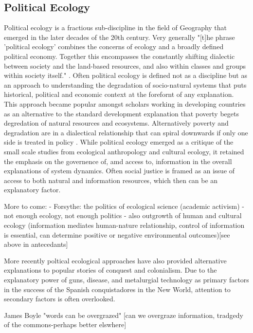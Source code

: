 \subsection{Political Ecology}

Political ecology is a fractious sub-discipline in the field of Geography that emerged in the later decades of the 20th century. Very generally "[t]he phrase 'political ecology' combines the concerns of ecology and a broadly defined political economy. Together this encompasses the constantly shifting dialectic between society and the land-based resources, and also within classes and groups within society itself." \citep[][p. 17]{blaikie_1987}. Often political ecology is defined not as a discipline but as an approach to understanding the degradation of socio-natural systems that puts historical, political and economic context at the forefornt of any explanation. This approach became popular amongst scholars working in developing countries as an alternative to the standard development explanation that poverty begets degredation of natural resources and ecosystems. Alternatively poverty and degradation are in a dialectical relationship that can spiral downwards if only one side is treated in policy \citep{blaikie_1987, peet_1996}. While political ecology emerged as a critique of the small scale studies from ecological anthropology and cultural ecology, it retained the emphasis on the governence of, amd access to, information in the overall explanations of system dynamics. Often social justice is framed as an issue of access to both natural and information resources, which then can be an explanatory factor.

More to come:
- Forsythe: the politics of ecological science (academic activism) \citep{forsyth_2003,huxley_1974}
- not enough ecology, not enough politics \citep{walker_2005,walker_2007}
- also outgrowth of human and cultural ecology (information mediates human-nature relationship, control of information is essential, can determine positive or negative environmental outcomes)[see above in antecedants]

More recently poltical ecological approaches have also provided alternative explanations to popular stories of conquest and colonialism. Due to the explanatory power of guns, disease, and metalurgial technology as primary factors in the success of the Spanish conquistadores in the New World, attention to secondary factors is often overlooked. 

James Boyle "words can be overgrazed" [can we overgraze information, tradgedy of the commons-perhaps better elswhere]
